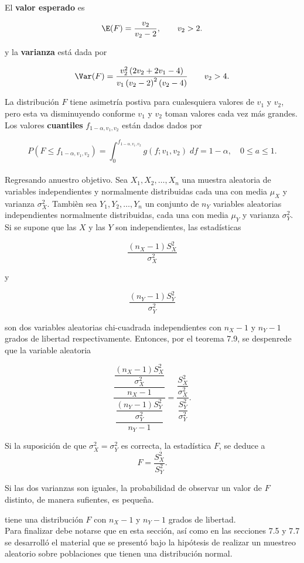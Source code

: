 El \textbf{valor esperado} es

\begin{tcolorbox}
    $$\E(F)=\dfrac{v_2}{v_2-2},\qquad v_2>2.$$
\end{tcolorbox}

y la \textbf{varianza} está dada por

\begin{tcolorbox}
    $$\Var(F)=\dfrac{v_2^2\left(2v_2+2v_1-4\right)}{v_1\left(v_2-2\right)^2\left(v_2-4\right)}\qquad v_2>4.$$
\end{tcolorbox}

La distribución $F$ tiene asimetría postiva para cualesquiera valores de $v_1$ y $v_2$, pero esta va disminuyendo conforme $v_1$ y $v_2$ toman valores cada vez más grandes.\\

Los valores \textbf{cuantiles} $f_{1-\alpha,v_1,v_2}$ están dados dados por

$$P(F\leq f_{1-\alpha,v_1,v_2})=\int_0^{f_{1-\alpha,v_1,v_2}}g\left(f;v_1,v_2\right)\; df=1-\alpha, \quad 0\leq a\leq 1.$$\\

Regresando anuestro objetivo. Sea $X_1,X_2,\ldots,X_n$ una muestra aleatoria de variables independientes y normalmente distribuidas cada una con media $\mu_X$ y varianza $\sigma^2_X$. Tambièn sea $Y_1,Y_2,\ldots,Y_n$ un conjunto de $n_Y$ variables aleatorias independientes normalmente distribuidas, cada una con media $\mu_Y$ y varianza $\sigma_Y^2$. Si se supone que las $X$ y las $Y$ son independientes, las estadísticas

$$\dfrac{(n_X-1)S_X^2}{\sigma_X^2}$$

y

$$\dfrac{(n_Y-1)S_Y^2}{\sigma_Y^2}$$

son dos variables aleatorias chi-cuadrada independientes con $n_X-1$ y $n_Y-1$ grados de libertad respectivamente. Entonces, por el teorema 7.9, se despenrede que la variable aleatoria

$$\dfrac{\dfrac{\dfrac{(n_X-1)S_X^2}{\sigma_X^2}}{n_X-1}}{\dfrac{\dfrac{(n_Y-1)S_Y^2}{\sigma_Y^2}}{n_Y-1}}=\dfrac{\dfrac{S_X^2}{\sigma_X^2}}{\dfrac{S_Y^2}{\sigma_Y^2}}.$$

Si la suposición de que $\sigma_X^2=\sigma_Y^2$ es correcta, la estadística $F$, se deduce a
$$F=\dfrac{S_X^2}{S_Y^2}.$$

Si las dos varianzas son iguales, la probabilidad de observar un valor de $F$ distinto, de manera sufientes, es pequeña.

tiene una distribución $F$ con $n_X-1$ y $n_Y-1$ grados de libertad.\\

Para finalizar debe notarse que en esta sección, así como en las secciones 7.5 y 7.7 se desarrolló el material que se presentó bajo la hipótesis de realizar un muestreo aleatorio sobre poblaciones que tienen una distribución normal.


